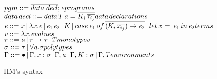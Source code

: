\begin{figure}
  $pgm::= \overline{data\;decl};\term\hfill programs$\\
  $data\,decl::= data\,T\,a=\overline{K_i\,\overline{\type_{i_j}}}\hfill data\,declarations$\\
  $\term ::= \tmVar\,|\,\lambda \tmVar.\term\,|\,\term_1 \, \term_2 \,|\,K\,|\,case \, \term_1 \, of\, \overline{(K_i \, \overline{\tmVar_{i_j}}) \rightarrow \term_2} \,|\, let \, \tmVar \, =\, \term_1 \,in\, \term_2 \hfill terms $\\
  $\tmVal::= \lambda \tmVar.\term \hfill values$\\
  $\type ::= \tyVar\,|\,\type \rightarrow \type\,|\,T \hfill monotypes$\\
  $\sigma ::= \type \,|\,\forall \tyVar.\sigma \hfill polytypes$\\
  $\tyEnv::=  \bullet \,|\, \tyEnv, \tmVar:\typeS\,|\, \tyEnv,\tyVar\,|\,\tyEnv, K : \typeS\,|\,\tyEnv, T \hfill environments$\\
  \caption{HM's syntax}
  \label{hmsyntax}
\end{figure}

